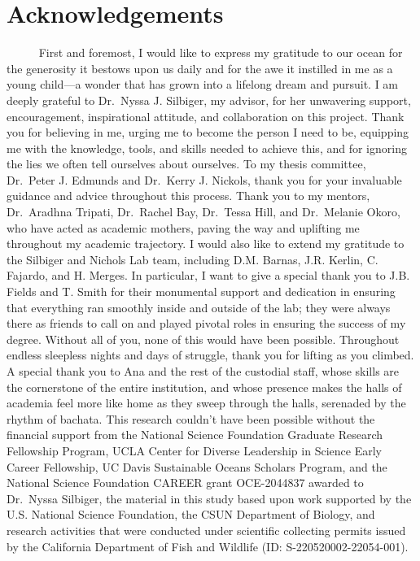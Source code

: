 \documentclass[
  12pt,
]{article}
\begin{document}
\newpage

\section*{Acknowledgements}

~~~~~ First and foremost, I would like to express my gratitude to our
ocean for the generosity it bestows upon us daily and for the awe it
instilled in me as a young child---a wonder that has grown into a
lifelong dream and pursuit. I am deeply grateful to Dr.~Nyssa J.
Silbiger, my advisor, for her unwavering support, encouragement,
inspirational attitude, and collaboration on this project. Thank you for
believing in me, urging me to become the person I need to be, equipping
me with the knowledge, tools, and skills needed to achieve this, and for
ignoring the lies we often tell ourselves about ourselves. To my thesis
committee, Dr.~Peter J. Edmunds and Dr.~Kerry J. Nickols, thank you for
your invaluable guidance and advice throughout this process. Thank you
to my mentors, Dr.~Aradhna Tripati, Dr.~Rachel Bay, Dr.~Tessa Hill, and
Dr.~Melanie Okoro, who have acted as academic mothers, paving the way
and uplifting me throughout my academic trajectory. I would also like to
extend my gratitude to the Silbiger and Nichols Lab team, including D.M.
Barnas, J.R. Kerlin, C. Fajardo, and H. Merges. In particular, I want to
give a special thank you to J.B. Fields and T. Smith for their
monumental support and dedication in ensuring that everything ran
smoothly inside and outside of the lab; they were always there as
friends to call on and played pivotal roles in ensuring the success of
my degree. Without all of you, none of this would have been possible.
Throughout endless sleepless nights and days of struggle, thank you for
lifting as you climbed. A special thank you to Ana and the rest of the
custodial staff, whose skills are the cornerstone of the entire
institution, and whose presence makes the halls of academia feel more
like home as they sweep through the halls, serenaded by the rhythm of
bachata. This research couldn't have been possible without the financial
support from the National Science Foundation Graduate Research
Fellowship Program, UCLA Center for Diverse Leadership in Science Early
Career Fellowship, UC Davis Sustainable Oceans Scholars Program, and the
National Science Foundation CAREER grant OCE-2044837 awarded to
Dr.~Nyssa Silbiger, the material in this study based upon work supported
by the U.S. National Science Foundation, the CSUN Department of Biology,
and research activities that were conducted under scientific collecting
permits issued by the California Department of Fish and Wildlife (ID:
S-220520002-22054-001).
\end{document}
